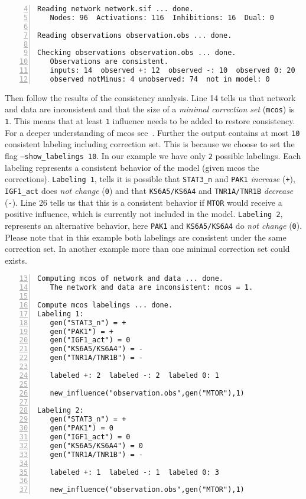 \documentclass{article}
\begin{document}
\begin{Verbatim}[frame=single,numbers=left,firstnumber=4] 
Reading network network.sif ... done.
   Nodes: 96  Activations: 116  Inhibitions: 16  Dual: 0

Reading observations observation.obs ... done.

Checking observations observation.obs ... done.
   Observations are consistent.
   inputs: 14  observed +: 12  observed -: 10  observed 0: 20  observed notPlus: 5  
   observed notMinus: 4 unobserved: 74  not in model: 0
\end{Verbatim}

Then follow the results of the consistency analysis.
Line 14 tells us that network and data are inconsistent 
and that the size of a \emph{minimal correction set} (\texttt{mcos}) is \texttt{1}.
This means that at least \texttt{1} influence needs to be added to restore consistency.
For a deeper understanding of mcos see~\cite{samaga13a}.
Further the output contains at most \texttt{10} consistent labeling including correction set. 
This is because we choose to set the flag \texttt{--show\_labelings 10}.
In our example we have only \texttt{2} possible labelings. 
Each labeling represents a consistent behavior of the model (given mcos the corrections).
\texttt{Labeling 1},
tells it is possible that 
\texttt{STAT3\_n} and \texttt{PAK1} \emph{increase} (\texttt{+}),
\texttt{IGF1\_act} does \emph{not change} (\texttt{0}) and that
\texttt{KS6A5/KS6A4} and \texttt{TNR1A/TNR1B} \emph{decrease} (\texttt{-}).
Line 26 tells us that this is a consistent behavior if \texttt{MTOR} would receive a positive influence, 
which is currently not included in the model.
\texttt{Labeling 2}, represents an alternative behavior,
 here  \texttt{PAK1} and \texttt{KS6A5/KS6A4} do \emph{not change} (\texttt{0}).
Please note that in this example both labelings are consistent under the same correction set.
In another example more than one minimal correction set could exists.

\begin{Verbatim}[frame=single,numbers=left,firstnumber=13]  
Computing mcos of network and data ... done.
   The network and data are inconsistent: mcos = 1.
  
Compute mcos labelings ... done.
Labeling 1:
   gen("STAT3_n") = +
   gen("PAK1") = +
   gen("IGF1_act") = 0
   gen("KS6A5/KS6A4") = -
   gen("TNR1A/TNR1B") = -

   labeled +: 2  labeled -: 2  labeled 0: 1 

   new_influence("observation.obs",gen("MTOR"),1)
   
Labeling 2:
   gen("STAT3_n") = +
   gen("PAK1") = 0
   gen("IGF1_act") = 0
   gen("KS6A5/KS6A4") = 0
   gen("TNR1A/TNR1B") = -

   labeled +: 1  labeled -: 1  labeled 0: 3 
   
   new_influence("observation.obs",gen("MTOR"),1)
\end{Verbatim}
\end{document}

